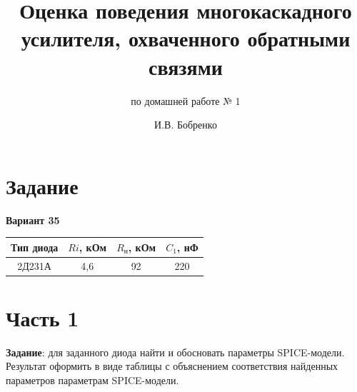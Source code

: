 \documentclass{labreport}
\title{Оценка поведения многокаскадного усилителя, охваченного обратными связями}
\subtitle{по домашней работе № 1}
\author{И.В. Бобренко}
\begin{document}
\maketitle

\tableofcontents

\chapter{Задание}

\textbf{Вариант 35}

\begin{tabular}{|c|c|c|c|}
    \hline
    Тип диода & $Ri$, кОм & $R_\text{н}$, кОм & $C_1$, нФ \\
    \hline
    2Д231А & 4,6 & 92 & 220 \\
    \hline
\end{tabular}


\chapter{Часть 1}
\textbf{Задание}: для заданного диода найти и обосновать параметры SPICE-модели. Результат оформить в виде таблицы с объяснением соответствия найденных параметров параметрам SPICE-модели.
\end{document}
